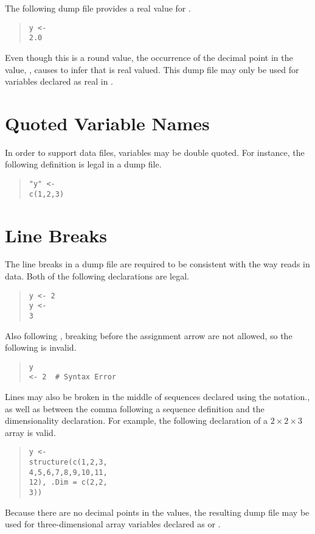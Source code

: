 The following dump file provides a real value for .
%
\begin{quote}
\begin{Verbatim}
y <-
2.0
\end{Verbatim}
\end{quote}
%
Even though this is a round value, the occurrence of the decimal
point in the value, , causes \Stan to infer that  is
real valued.  This dump file may only be used for variables 
declared as real in \Stan.


\section{Quoted Variable Names}

In order to support \JAGS data files, variables may be double quoted.
For instance, the following definition is legal in a dump file.
%
\begin{quote}
\begin{Verbatim}
"y" <-
c(1,2,3)
\end{Verbatim}
\end{quote}

\section{Line Breaks}

The line breaks in a dump file are required to be consistent with
the way \R reads in data.  Both of the following declarations are
legal.
%
\begin{quote}
\begin{Verbatim}
y <- 2
y <-
3
\end{Verbatim}
\end{quote}
%
Also following \R, breaking before the assignment arrow are not
allowed, so the following is invalid.
%
\begin{quote}
\begin{Verbatim}
y
<- 2  # Syntax Error
\end{Verbatim}
\end{quote}

Lines may also be broken in the middle of sequences declared
using the  notation., as well as between the comma
following a sequence definition and the dimensionality declaration.
For example, the following declaration of a $2 \times 2 \times 3$
array is valid.
%
\begin{quote}
\begin{Verbatim}
y <-
structure(c(1,2,3,
4,5,6,7,8,9,10,11,
12), .Dim = c(2,2,
3))
\end{Verbatim}
\end{quote}
%
Because there are no decimal points in the values, the resulting dump
file may be used for three-dimensional array variables declared as
 or .

